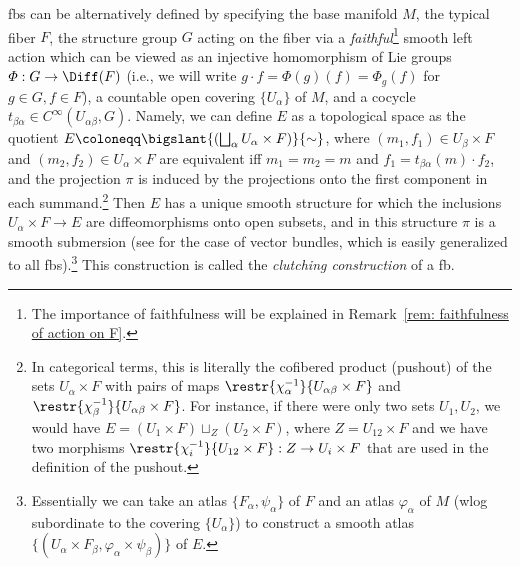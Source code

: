 \begin{defn}\label{def bundle construction}
    \Glspl{fb} can be alternatively defined by specifying the base manifold $M$, the typical fiber $F$, the structure group $G$ acting on the fiber via a \emph{faithful}\footnote{The importance of faithfulness will be explained in Remark~\ref{rem: faithfulness of action on F}.} smooth left action which can be viewed as an injective homomorphism of Lie groups $\varPhi:G\to \Diff(F)$ (i.e., we will write $g\cdot f=\varPhi(g)(f)=\varPhi_g(f)$ for $g\in G, f\in F$), a countable open covering $\{U_\alpha\}$ of $M$, and a cocycle  $t_{\beta\alpha}\in C^\infty (U_{\alpha\beta}, G)$. Namely, we can define $E$ as a topological space as the quotient $E\coloneqq \bigslant{(\bigsqcup_\alpha U_\alpha \times F)}{\sim}$, where $(m_1,f_1)\in U_\beta\times F$ and $(m_2,f_2)\in U_\alpha\times F$ are equivalent iff $m_1=m_2=m$ and $f_1=t_{\beta\alpha}(m)\cdot f_2$, and the projection $\pi$ is induced by the projections onto the first component in each summand.\footnote{In categorical terms, this is literally the cofibered product (pushout) of the sets $U_\alpha \times F$ with pairs of maps $\restr{\chi_\alpha^{-1}}{U_{\alpha\beta}\times F}$ and $\restr{\chi_\beta^{-1}}{U_{\alpha\beta}\times F}$. For instance, if there were only two sets $U_1,U_2$, we would have $E=(U_1\times F)\sqcup_Z (U_2\times F)$, where $Z=U_{12}\times F$ and we have two morphisms $\restr{\chi_i^{-1}}{U_{12}\times F}:Z\to U_i\times F$ that are used in the definition of the pushout.}
    Then $E$ has a unique smooth structure for which the inclusions $U_\alpha\times F\to E$ are diffeomorphisms onto open subsets, and in this structure $\pi$ is a smooth submersion (see \cite[Lem.~10.6]{Lee} for the case of vector bundles, which is easily generalized to all \glspl{fb}).\footnote{Essentially we can take an atlas $\{F_\alpha,\psi_\alpha\}$ of $F$ and an atlas $\varphi_\alpha$ of $M$ (\gls{wlog} subordinate to the covering $\{U_\alpha\}$) to construct a smooth atlas $\{(U_\alpha\times F_\beta,\varphi_\alpha\times\psi_\beta)\}$ of $E$.} This construction is called the \emph{clutching construction} of a \gls{fb}.
\end{defn}


